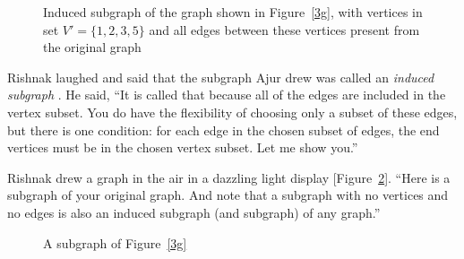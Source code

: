 \begin{figure}
\begin{center}
\caption{Induced subgraph of the graph shown in Figure~\ref{3g}, with vertices in set $V'=\{1,2,3,5\}$ and all edges between these vertices present from the original graph}\label{3g1}
\end{center}
\end{figure}

Rishnak laughed and said that the subgraph Ajur drew was called an \textit{induced subgraph} . He said, ``It is called that because all of the edges are included in the vertex subset. You do have the flexibility of choosing only a subset of these edges, but there is one condition: for each edge in the chosen subset of edges, the end vertices must be in the chosen vertex subset. Let me show you.''

Rishnak drew a graph in the air in a dazzling light display [Figure~\ref{3g2}]. ``Here is a subgraph of your original graph. And note that a subgraph with no vertices and no edges is also an induced subgraph (and subgraph) of any graph.''

\begin{figure}
\begin{center}
\caption{A subgraph of Figure~\ref{3g}}\label{3g2}
\end{center}
\end{figure}



